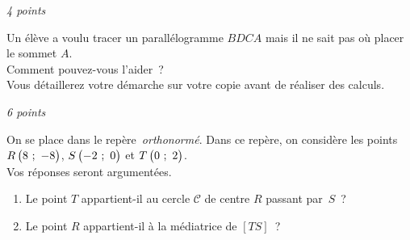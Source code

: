 \documentclass[a4paper,12pt,twocolumn,landscape]{article}
\begin{document}
\vspace*{1em}

\begin{minipage}{0.45\textwidth}
\thispagestyle{firststyle}

\vspace*{1em}

\exercice\hfill \emph{4 points}

Un élève a voulu tracer un parallélogramme $BDCA$ mais il ne sait pas où placer le sommet $A$.\\ Comment pouvez-vous l'aider~?\\ Vous détaillerez votre démarche sur votre copie avant de réaliser des calculs.

\begin{center}


\end{center}


\vspace*{2em}

\exercice\hfill \emph{6 points}

On se place dans le repère~\emph{orthonormé}. Dans ce repère, on considère les points $R\begin{pmatrix}8~;~-8\end{pmatrix}$, $S\begin{pmatrix}-2~;~0\end{pmatrix}$ et $T\begin{pmatrix}0~;~2\end{pmatrix}$.\\Vos réponses seront argumentées.

	\begin{enumerate}
		\item Le point $T$ appartient-il au cercle $\mathscr{C}$ de centre $R$ passant par~$S$~?
		\item Le point $R$ appartient-il à la médiatrice de $\left[TS\right]$~?
	\end{enumerate}



\vspace{-2em}


\end{minipage}
\newpage
\end{document}
